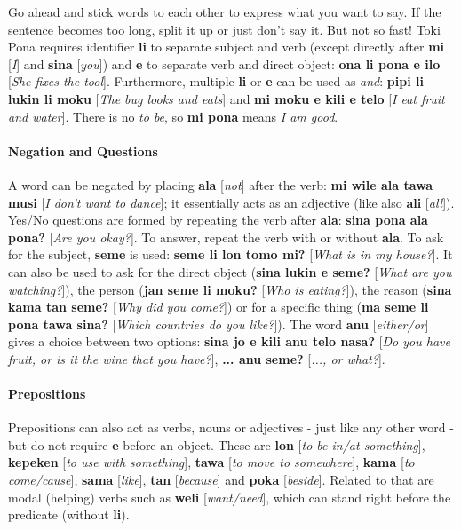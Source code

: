 \documentclass[10pt,a4paper]{article}
\begin{document}
\begin{multicols}{2}
Go ahead and stick words to each other to express what you want to say. If the sentence becomes too long, split it up or just don't say it. But not so fast! Toki Pona requires identifier \textbf{li} to separate subject and verb (except directly after \textbf{mi} [\textit{I}] and \textbf{sina} [\textit{you}]) and \textbf{e} to separate verb and direct object: \textbf{ona li pona e ilo} [\textit{She fixes the tool}]. Furthermore, multiple \textbf{li} or \textbf{e} can be used as \textit{and}: \textbf{pipi li lukin li moku} [\textit{The bug looks and eats}] and \textbf{mi moku e kili e telo} [\textit{I eat fruit and water}]. There is no \textit{to be}, so \textbf{mi pona} means \textit{I am good}.

\paragraph{Negation and Questions}

A word can be negated by placing \textbf{ala} [\textit{not}] after the verb: \textbf{mi wile ala tawa musi} [\textit{I don't want to dance}]; it essentially acts as an adjective (like also \textbf{ali} [\textit{all}]). Yes/No questions are formed by repeating the verb after \textbf{ala}: \textbf{sina pona ala pona?} [\textit{Are you okay?}]. To answer, repeat the verb with or without \textbf{ala}. To ask for the subject, \textbf{seme} is used: \textbf{seme li lon tomo mi?} [\textit{What is in my house?}]. It can also be used to ask for the direct object (\textbf{sina lukin e seme?} [\textit{What are you watching?}]), the person (\textbf{jan seme li moku?} [\textit{Who is eating?}]), the reason (\textbf{sina kama tan seme?} [\textit{Why did you come?}]) or for a specific thing (\textbf{ma seme li pona tawa sina?} [\textit{Which countries do you like?}]). The word \textbf{anu} [\textit{either/or}] gives a choice between two options: \textbf{sina jo e kili anu telo nasa?} [\textit{Do you have fruit, or is it the wine that you have?}], \textbf{... anu seme?} [\textit{..., or what?}].
\end{multicols}

\paragraph{Prepositions}

Prepositions can also act as verbs, nouns or adjectives - just like any other word - but do not require \textbf{e} before an object. These are \textbf{lon} [\textit{to be in/at something}], \textbf{kepeken} [\textit{to use with something}], \textbf{tawa} [\textit{to move to somewhere}], \textbf{kama} [\textit{to come/cause}], \textbf{sama} [\textit{like}], \textbf{tan} [\textit{because}] and \textbf{poka} [\textit{beside}]. Related to that are modal (helping) verbs such as \textbf{weli} [\textit{want/need}], which can stand right before the predicate (without \textbf{li}).
\end{document}
